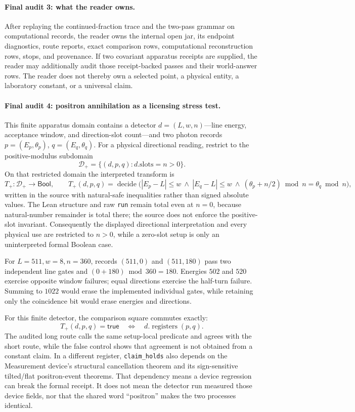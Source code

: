 \paragraph{Final audit 3: what the reader owns.}
After replaying the continued-fraction trace and the two-pass grammar on computational records, the reader owns the
internal open jar, its endpoint diagnostics, route reports, exact comparison rows, computational reconstruction rows,
stops, and provenance.  If two covariant apparatus receipts are supplied, the reader may additionally audit those
receipt-backed passes and their world-answer rows.  The reader does not thereby own a selected point, a physical
entity, a laboratory constant, or a universal claim.

\paragraph{Final audit 4: positron annihilation as a licensing stress test.}
This finite apparatus domain contains a detector
\(d=(L,w,n)\)---line energy, acceptance window, and direction-slot count---and two photon records
\(p=(E_p,\theta_p)\), \(q=(E_q,\theta_q)\).  For a physical directional reading, restrict to the
positive-modulus subdomain
\[
 \mathcal D_+=\{(d,p,q):d.\mathrm{slots}=n>0\}.
\]
On that restricted domain the interpreted transform is
\[
 T_+:\mathcal D_+\longrightarrow\mathsf{Bool},\qquad
 T_+(d,p,q)=\operatorname{decide}\bigl(
 |E_p-L|\le w\ \land\ |E_q-L|\le w\ \land\
 (\theta_p+n/2)\bmod n=\theta_q\bmod n\bigr),
\]
written in the source with natural-safe inequalities rather than signed absolute values.  The Lean structure and raw
\texttt{run} remain total even at \(n=0\), because natural-number remainder is total there; the source does not enforce
the positive-slot invariant.  Consequently the displayed directional interpretation and every physical use are
restricted to \(n>0\), while a zero-slot setup is only an uninterpreted formal Boolean case.

For \(L=511,w=8,n=360\), records \((511,0)\) and \((511,180)\) pass two independent line gates and
\((0+180)\bmod360=180\).  Energies \(502\) and \(520\) exercise opposite window failures; equal directions exercise
the half-turn failure.  Summing to \(1022\) would erase the implemented individual gates, while retaining only the
coincidence bit would erase energies and directions.

For this finite detector, the comparison square commutes exactly:
\[
 T_+(d,p,q)=\mathsf{true}
 \quad\Longleftrightarrow\quad
 d.\operatorname{registers}(p,q).
\]
The audited long route calls the same setup-local predicate and agrees with the short route, while the false control
shows that agreement is not obtained from a constant claim.  In a different register, \texttt{claim\_holds} also depends on
the Measurement device's structural cancellation theorem and its sign-sensitive tilted/flat positron-event theorems.
That dependency means a device regression can break the formal receipt.  It does not mean the detector run measured
those device fields, nor that the shared word ``positron'' makes the two processes identical.

